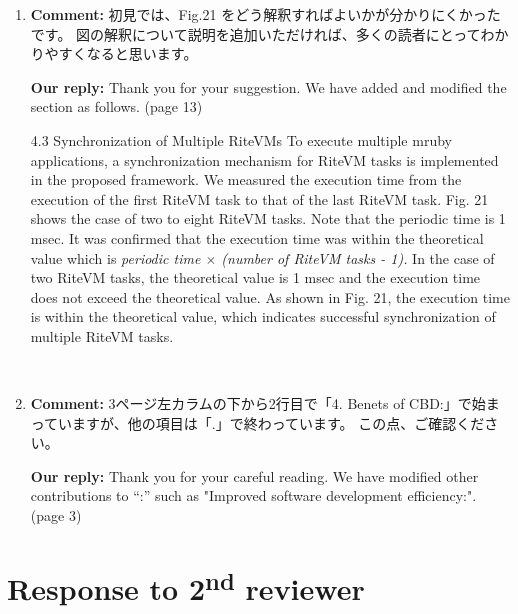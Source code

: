 \documentclass{article}
\newcommand\nd{\textsuperscript{nd}\xspace}
\begin{document}
\begin{enumerate}

\item \begin{flushleft}
    \textbf{Comment:
}初見では、Fig.21 をどう解釈すればよいかが分かりにくかったです。
図の解釈について説明を追加いただければ、多くの読者にとってわかりやすくなると思います。
  \end{flushleft}

  \begin{flushleft}
    \textbf{Our reply:}
Thank you for your suggestion.
We have added and modified the section as follows. (page 13)

\begin{itembox}[|]{4.3 Synchronization of Multiple RiteVMs}
To execute multiple mruby applications, a synchronization mechanism for RiteVM tasks is implemented in the proposed framework.
We measured the execution time from the execution of the first RiteVM task to that of the last RiteVM task.
Fig. 21 shows the case of two to eight RiteVM tasks.
Note that the periodic time is 1 msec.
It was confirmed that the execution time was within the theoretical value which is {\it\scriptsize periodic time $\times$ (number of RiteVM tasks - 1).}
In the case of two RiteVM tasks, the theoretical value is 1 msec and the execution time does not exceed the theoretical value. 
As shown in Fig. 21, the execution time is within the theoretical value, which indicates successful synchronization of multiple RiteVM tasks.
\end{itembox}\\
  \end{flushleft}


\item \begin{flushleft}
    \textbf{Comment:}
3ページ左カラムの下から2行目で「4. Benets of CBD:」で始まっていますが、他の項目は「.」で終わっています。
この点、ご確認ください。
  \end{flushleft}

  \begin{flushleft}
    \textbf{Our reply:}
Thank you for your careful reading.
We have modified other contributions to ``:'' such as "Improved software development efficiency:". (page 3)
  \end{flushleft}

\end{enumerate}

\newpage

\section{Response to 2\nd reviewer}
\end{document}
